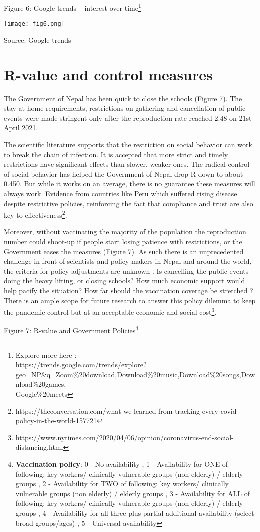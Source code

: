 \documentclass{article}
\begin{document}
\textcolor{black!65}{Figure 6: Google trends – interest over time\footnote{Explore more here :\\ https://trends.google.com/trends/explore?geo=NP\&q=Zoom\%20download,Download\%20music,Download\%20songs,Download\%20games,\\Google\%20meets}}

\texttt{[image: fig6.png]}

\textcolor{black!65}{Source: Google trends}

\section{R-value and control measures}
The Government of Nepal has been quick to close the schools (Figure 7). The stay at home requirements, restrictions on gathering and cancellation of public events were made stringent only after the reproduction rate reached 2.48 on 21st April 2021. 

The scientific literature supports that the restriction on social behavior can work to break the chain of infection. It is accepted that more strict and timely restrictions have significant effects than slower, weaker ones. The radical control of social behavior has helped the Government of Nepal drop R down to about 0.450. But while it works on an average, there is no guarantee these measures will always work. Evidence from countries like Peru which suffered rising disease despite restrictive policies, reinforcing the fact that compliance and trust are also key to effectiveness\footnote{https://theconversation.com/what-we-learned-from-tracking-every-covid-policy-in-the-world-157721}. 

Moreover, without vaccinating the majority of the population the reproduction number could shoot-up if people start losing patience with restrictions, or the Government eases the measures (Figure 7). 
As such there is an unprecedented challenge in front of scientists and policy makers in Nepal and around the world, the criteria for policy adjustments are unknown . Is cancelling the public events doing the heavy lifting, or closing schools? How much economic support would help pacify the situation? How far should the vaccination coverage be stretched ? There is an ample scope for future research to answer this policy dilemma to keep the pandemic control but at an acceptable economic and social cost\footnote{ https://www.nytimes.com/2020/04/06/opinion/coronavirus-end-social-distancing.html}.

\textcolor{black!65}{Figure 7: R-value and Government Policies\footnote{\textbf{Vaccination policy}: 0 - No availability , 1 - Availability for ONE of following: key workers/ clinically vulnerable groups (non elderly) / elderly groups , 2 - Availability for TWO of following: key workers/ clinically vulnerable groups (non elderly) / elderly groups , 3 - Availability for ALL of following: key workers/ clinically vulnerable groups (non elderly) / elderly groups , 4 - Availability for all three plus partial additional availability (select broad groups/ages) , 5 - Universal availability
}}
\end{document}
